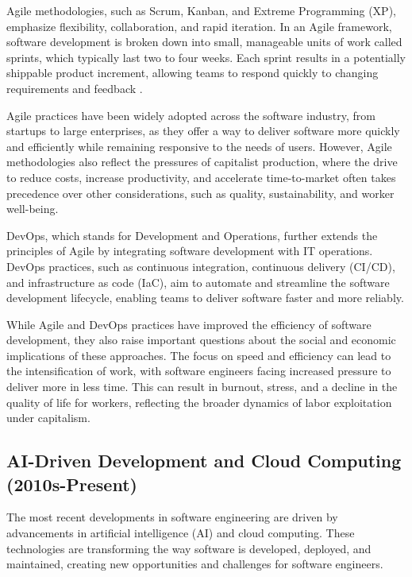 \begin{refsection}
\begin{multicols}{2}
{Agile methodologies, such as Scrum, Kanban, and Extreme Programming (XP), emphasize flexibility, collaboration, and rapid iteration. In an Agile framework, software development is broken down into small, manageable units of work called sprints, which typically last two to four weeks. Each sprint results in a potentially shippable product increment, allowing teams to respond quickly to changing requirements and feedback \cite[p. 3]{fowler1999}.

Agile practices have been widely adopted across the software industry, from startups to large enterprises, as they offer a way to deliver software more quickly and efficiently while remaining responsive to the needs of users. However, Agile methodologies also reflect the pressures of capitalist production, where the drive to reduce costs, increase productivity, and accelerate time-to-market often takes precedence over other considerations, such as quality, sustainability, and worker well-being.

DevOps, which stands for Development and Operations, further extends the principles of Agile by integrating software development with IT operations. DevOps practices, such as continuous integration, continuous delivery (CI/CD), and infrastructure as code (IaC), aim to automate and streamline the software development lifecycle, enabling teams to deliver software faster and more reliably.

While Agile and DevOps practices have improved the efficiency of software development, they also raise important questions about the social and economic implications of these approaches. The focus on speed and efficiency can lead to the intensification of work, with software engineers facing increased pressure to deliver more in less time. This can result in burnout, stress, and a decline in the quality of life for workers, reflecting the broader dynamics of labor exploitation under capitalism.

\subsection{AI-Driven Development and Cloud Computing (2010s-Present)}

The most recent developments in software engineering are driven by advancements in artificial intelligence (AI) and cloud computing. These technologies are transforming the way software is developed, deployed, and maintained, creating new opportunities and challenges for software engineers.

}
\end{multicols}
\end{refsection}
